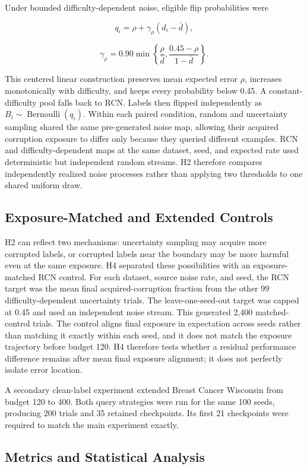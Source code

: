 \documentclass[11pt]{article}
\begin{document}
Under bounded difficulty-dependent noise, eligible flip probabilities were

\[
q_i=\rho+\gamma_\rho(d_i-\bar d),
\]

\[
\gamma_\rho=0.90\min\left\{
\frac{\rho}{\bar d},
\frac{0.45-\rho}{1-\bar d}
\right\}.
\]

This centered linear construction preserves mean expected error $\rho$,
increases monotonically with difficulty, and keeps every probability below
0.45. A constant-difficulty pool falls back to RCN. Labels then flipped
independently as $B_i\sim\operatorname{Bernoulli}(q_i)$. Within each paired
condition, random and uncertainty sampling shared the same pre-generated
noise map, allowing their acquired corruption exposure to differ only because
they queried different examples. RCN and difficulty-dependent maps at the same
dataset, seed, and expected rate used deterministic but independent random
streams. H2 therefore compares independently realized noise processes rather
than applying two thresholds to one shared uniform draw.

\subsection{Exposure-Matched and Extended Controls}

H2 can reflect two mechanisms: uncertainty sampling may acquire more corrupted
labels, or corrupted labels near the boundary may be more harmful even at the
same exposure. H4 separated these possibilities with an exposure-matched RCN
control. For each dataset, source noise rate, and seed, the RCN target was the
mean final acquired-corruption fraction from the other 99 difficulty-dependent
uncertainty trials. The leave-one-seed-out target was capped at 0.45 and used
an independent noise stream. This generated 2,400 matched-control trials.
The control aligns final exposure in expectation across seeds rather than
matching it exactly within each seed, and it does not match the exposure
trajectory before budget 120. H4 therefore tests whether a residual
performance difference remains after mean final exposure alignment; it does
not perfectly isolate error location.

A secondary clean-label experiment extended Breast Cancer Wisconsin from
budget 120 to 400. Both query strategies were run for the same 100 seeds,
producing 200 trials and 35 retained checkpoints. Its first 21 checkpoints
were required to match the main experiment exactly.

\subsection{Metrics and Statistical Analysis}
\end{document}
